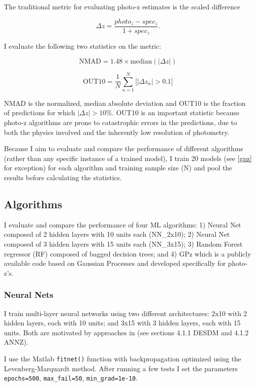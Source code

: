 \documentclass[13pt]{amsart}
\newcommand{\nequ}[2]{\begin{equation}#1 \label{#2}\end{equation}}
\newcommand{\equin}[1]{\(#1\)}
\begin{document}
  The traditional metric for evaluating photo-z estimates is the scaled difference

  \nequ{\Delta z = \frac{photo_z-spec_z}{1+spec_z}.}{equ:deltaz}

  I evaluate the following two statistics on the metric:

  \nequ{\textrm{NMAD} = 1.48 \times \textrm{median}(|\Delta z|)}{equ:nmad}

  \nequ{\textrm{OUT10} = \frac{1}{N} \sum_{n=1}^N \big[ | \Delta z_n | > 0.1 \big]}{equ:out10}

  NMAD is the normalized, median absolute deviation and OUT10 is the fraction of predictions for which \equin{|\Delta z| > 10\%}. OUT10 is an important statistic because photo-z algorithms are prone to catastrophic errors in the predictions, due to both the physics involved and the inherently low resolution of photometry.

  Because I aim to evaluate and compare the performance of different algorithms (rather than any specific instance of a trained model), I train 20 models (see \ref{gpz} for exception) for each algorithm and training sample size (N) and pool the results before calculating the statistics.



  \subsection{Algorithms}

    I evaluate and compare the performance of four ML algorithms: 1) Neural Net composed of 2 hidden layers with 10 units each (NN\_2x10); 2) Neural Net composed of 3 hidden layers with 15 units each (NN\_3x15); 3) Random Forest regressor (RF) composed of bagged decision trees; and 4) GPz which is a publicly available code based on Gaussian Processes and developed specifically for photo-z's.


    \subsubsection{Neural Nets}

      I train multi-layer neural networks using two different architectures: 2x10 with 2 hidden layers, each with 10 units; and 3x15 with 3 hidden layers, each with 15 units. Both are motivated by approaches in \cite{pzreview} (see sections 4.1.1 DESDM and 4.1.2 ANNZ).

      I use the Matlab \texttt{fitnet()} function with backpropagation optimized using the Levenberg-Marquardt method. After running a few tests I set the parameters \texttt{epochs=500}, \texttt{max\_fail=50}, \texttt{min\_grad=1e-10}.
\end{document}
